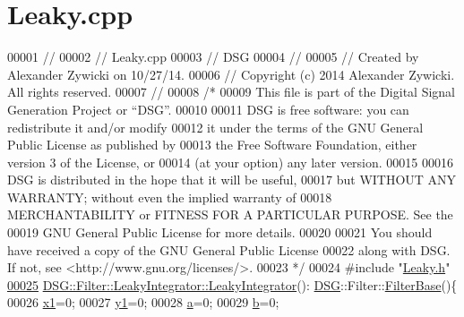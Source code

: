 \hypertarget{_leaky_8cpp_source}{\section{Leaky.\+cpp}
\label{_leaky_8cpp_source}
}

\begin{DoxyCode}
00001 \textcolor{comment}{//}
00002 \textcolor{comment}{//  Leaky.cpp}
00003 \textcolor{comment}{//  DSG}
00004 \textcolor{comment}{//}
00005 \textcolor{comment}{//  Created by Alexander Zywicki on 10/27/14.}
00006 \textcolor{comment}{//  Copyright (c) 2014 Alexander Zywicki. All rights reserved.}
00007 \textcolor{comment}{//}
00008 \textcolor{comment}{/*}
00009 \textcolor{comment}{ This file is part of the Digital Signal Generation Project or “DSG”.}
00010 \textcolor{comment}{}
00011 \textcolor{comment}{ DSG is free software: you can redistribute it and/or modify}
00012 \textcolor{comment}{ it under the terms of the GNU General Public License as published by}
00013 \textcolor{comment}{ the Free Software Foundation, either version 3 of the License, or}
00014 \textcolor{comment}{ (at your option) any later version.}
00015 \textcolor{comment}{}
00016 \textcolor{comment}{ DSG is distributed in the hope that it will be useful,}
00017 \textcolor{comment}{ but WITHOUT ANY WARRANTY; without even the implied warranty of}
00018 \textcolor{comment}{ MERCHANTABILITY or FITNESS FOR A PARTICULAR PURPOSE.  See the}
00019 \textcolor{comment}{ GNU General Public License for more details.}
00020 \textcolor{comment}{}
00021 \textcolor{comment}{ You should have received a copy of the GNU General Public License}
00022 \textcolor{comment}{ along with DSG.  If not, see <http://www.gnu.org/licenses/>.}
00023 \textcolor{comment}{ */}
00024 \textcolor{preprocessor}{#include "\hyperlink{_leaky_8h}{Leaky.h}"}
\hypertarget{_leaky_8cpp_source_l00025}{}\hyperlink{class_d_s_g_1_1_filter_1_1_leaky_integrator_af0d204e3c2f5f844dc4355810f6515c2}{00025} \hyperlink{class_d_s_g_1_1_filter_1_1_leaky_integrator_af0d204e3c2f5f844dc4355810f6515c2}{DSG::Filter::LeakyIntegrator::LeakyIntegrator}():
      \hyperlink{namespace_d_s_g}{DSG}::Filter::\hyperlink{class_d_s_g_1_1_filter_1_1_filter_base}{FilterBase}()\{
00026     \hyperlink{class_d_s_g_1_1_filter_1_1_leaky_integrator_a052c709de4d6cddfdc0fb0441275ce98}{x1}=0;
00027     \hyperlink{class_d_s_g_1_1_filter_1_1_leaky_integrator_a338246cc32a709070753696cf827624c}{y1}=0;
00028     \hyperlink{class_d_s_g_1_1_filter_1_1_leaky_integrator_a9a321b7650923119fda60595a7659aef}{a}=0;
00029     \hyperlink{class_d_s_g_1_1_filter_1_1_leaky_integrator_abb7e9fc15eef17836979b98b8b50880d}{b}=0;

\end{DoxyCode}
